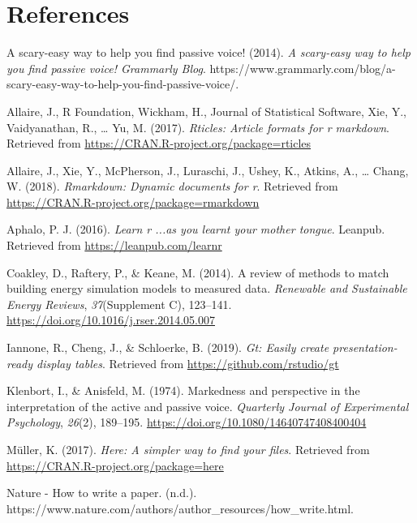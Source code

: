 \documentclass[]{elsarticle} %
\begin{document}
\section*{References}\label{references}

\hypertarget{refs}{}
\hypertarget{ref-ScaryeasyWayHelp2014}{}
A scary-easy way to help you find passive voice! (2014). \emph{A
scary-easy way to help you find passive voice! \textbar{} Grammarly
Blog}.
https://www.grammarly.com/blog/a-scary-easy-way-to-help-you-find-passive-voice/.

\hypertarget{ref-rticles}{}
Allaire, J., R Foundation, Wickham, H., Journal of Statistical Software,
Xie, Y., Vaidyanathan, R., \ldots{} Yu, M. (2017). \emph{Rticles:
Article formats for r markdown}. Retrieved from
\url{https://CRAN.R-project.org/package=rticles}

\hypertarget{ref-rmarkdown}{}
Allaire, J., Xie, Y., McPherson, J., Luraschi, J., Ushey, K., Atkins,
A., \ldots{} Chang, W. (2018). \emph{Rmarkdown: Dynamic documents for
r}. Retrieved from \url{https://CRAN.R-project.org/package=rmarkdown}

\hypertarget{ref-ggpmisc}{}
Aphalo, P. J. (2016). \emph{Learn r ...as you learnt your mother
tongue}. Leanpub. Retrieved from \url{https://leanpub.com/learnr}

\hypertarget{ref-coakleyReviewMethodsMatch2014}{}
Coakley, D., Raftery, P., \& Keane, M. (2014). A review of methods to
match building energy simulation models to measured data.
\emph{Renewable and Sustainable Energy Reviews}, \emph{37}(Supplement
C), 123--141. \url{https://doi.org/10.1016/j.rser.2014.05.007}

\hypertarget{ref-gt}{}
Iannone, R., Cheng, J., \& Schloerke, B. (2019). \emph{Gt: Easily create
presentation-ready display tables}. Retrieved from
\url{https://github.com/rstudio/gt}

\hypertarget{ref-klenbortMarkednessPerspectiveInterpretation1974}{}
Klenbort, I., \& Anisfeld, M. (1974). Markedness and perspective in the
interpretation of the active and passive voice. \emph{Quarterly Journal
of Experimental Psychology}, \emph{26}(2), 189--195.
\url{https://doi.org/10.1080/14640747408400404}

\hypertarget{ref-here}{}
Müller, K. (2017). \emph{Here: A simpler way to find your files}.
Retrieved from \url{https://CRAN.R-project.org/package=here}

\hypertarget{ref-NatureHowWrite}{}
Nature - How to write a paper. (n.d.).
https://www.nature.com/authors/author\_resources/how\_write.html.
\end{document}
